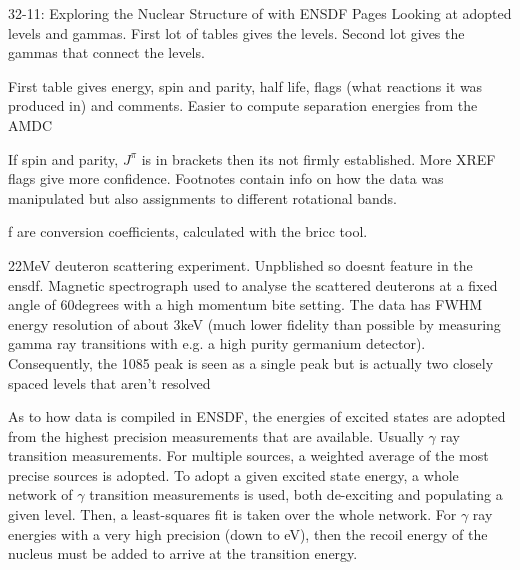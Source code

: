 \begin{example}{3}{2-11: Exploring the Nuclear Structure of  with ENSDF Pages}
Looking at adopted levels and gammas. First lot of tables gives the levels. Second lot gives the gammas that connect the levels.

First table gives energy, spin and parity, half life, flags (what reactions it was produced in) and comments. 
Easier to compute separation energies from the AMDC

If spin and parity, \(J^\pi\) is in brackets then its not firmly established. More XREF flags give more confidence. Footnotes contain info on how the data was manipulated but also assignments to different rotational bands. 

f are conversion coefficients, calculated with the bricc tool.

22MeV deuteron scattering experiment. Unpblished so doesnt feature in the ensdf. Magnetic spectrograph used to analyse the scattered deuterons at a fixed angle of 60degrees with a high momentum bite setting. The data has FWHM energy resolution of about 3keV (much lower fidelity than possible by measuring gamma ray transitions with e.g. a high purity germanium detector). Consequently, the 1085 peak is seen as a single peak but is actually two closely spaced levels that aren't resolved 

As to how data is compiled in ENSDF, the energies of excited states are adopted from the highest precision measurements that are available. Usually \(\gamma\) ray transition measurements. For multiple sources, a weighted average of the most precise sources is adopted. To adopt a given excited state energy, a whole network of \(\gamma\) transition measurements is used, both de-exciting and populating a given level. Then, a least-squares fit is taken over the whole network. For \(\gamma\) ray energies with a very high precision (down to eV), then the recoil energy of the nucleus must be added to arrive at the transition energy. 
    
\end{example}


